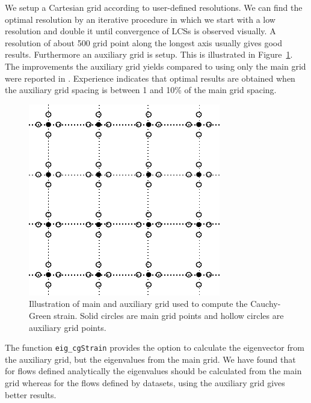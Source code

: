 \documentclass{article}
\begin{document}
We setup a Cartesian grid according to user-defined resolutions. We can find the optimal resolution by an iterative procedure in which we start with a low resolution and double it until convergence of LCSs is observed visually. A resolution of about 500 grid point along the longest axis usually gives good results. Furthermore an auxiliary grid is setup. This is illustrated in Figure~\ref{f:main and auxiliary grids}. The improvements the auxiliary grid yields compared to using only the main grid were reported in \textcite{farazmand12:_comput_lagran}. Experience indicates that optimal results are obtained when the auxiliary grid spacing is between 1 and 10\% of the main grid spacing.

\begin{figure}
\begin{center}
\includegraphics[width=\textwidth]{graphics/main_aux_grids}
\end{center}
\caption{Illustration of main and auxiliary grid used to compute the Cauchy-Green strain. Solid circles are main grid points and hollow circles are auxiliary grid points.}
\label{f:main and auxiliary grids}
\end{figure}

The function \lstinline!eig_cgStrain! provides the option to calculate the eigenvector from the auxiliary grid, but the eigenvalues from the main grid. We have found that for flows defined analytically the eigenvalues should be calculated from the main grid whereas for the flows defined by datasets, using the auxiliary grid gives better results.
\end{document}
